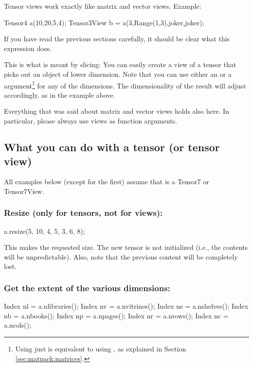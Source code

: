 Tensor views work exactly like matrix and vector views. Example:
\begin{code}
Tensor4 a(10,20,5,4);
Tensor3View b = a(3,Range(1,3),joker,joker);
\end{code}
If you have read the previous sections carefully, it should be clear
what this expression does.

This is what is meant by slicing: You can easily create a view of a
tensor that picks out an object of lower dimension. Note that you can
use either an  or a 
argument\footnote{Using just  is equivalent to using
  , as explained in Section
  \ref{sec:matpack:matrices}.} for any of the dimensions. The
dimensionality of the result will adjust accordingly, as in the
example above.

Everything that was said about matrix and vector views holds also
here. In particular, please always use views as function arguments. 

\subsection{What you can do with a tensor (or tensor view)}

All examples below (except for the first) assume that  is a
Tensor7 or Tensor7View.

\subsubsection{Resize (only for tensors, not for views):}
\begin{code}
a.resize(5, 10, 4, 5, 3, 6, 8);
\end{code}
This makes  the requested size. The new tensor is not
initialized (i.e., the contents will be unpredictable). Also, note
that the previous content will be completely lost.

\subsubsection{Get the extent of the various dimensions:}
\begin{code}
Index nl = a.nlibraries();
Index nv = a.nvitrines();
Index ns = a.nshelves();
Index nb = a.nbooks();
Index np = a.npages();
Index nr = a.nrows();
Index nc = a.ncols();
\end{code}

